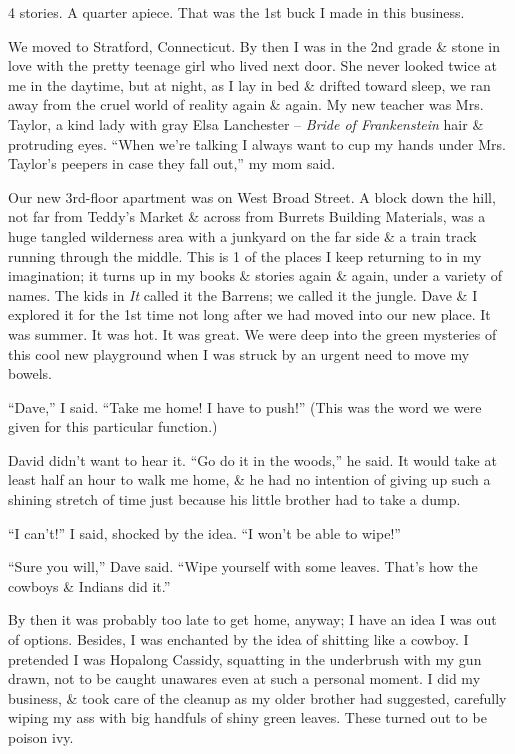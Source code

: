 \documentclass{article}
\numberwithin{equation}{section}
\begin{document}
4 stories. A quarter apiece. That was the 1st buck I made in this business.

 We moved to Stratford, Connecticut. By then I was in the 2nd grade \& stone in love with the pretty teenage girl who lived next door. She never looked twice at me in the daytime, but at night, as I lay in bed \& drifted toward sleep, we ran away from the cruel world of reality again \& again. My new teacher was Mrs. Taylor, a kind lady with gray Elsa Lanchester -- \textit{Bride of Frankenstein} hair \& protruding eyes. ``When we're talking I always want to cup my hands under Mrs. Taylor's peepers in case they fall out,'' my mom said.

Our new 3rd-floor apartment was on West Broad Street. A block down the hill, not far from Teddy's Market \& across from Burrets Building Materials, was a huge tangled wilderness area with a junkyard on the far side \& a train track running through the middle. This is 1 of the places I keep returning to in my imagination; it turns up in my books \& stories again \& again, under a variety of names. The kids in \textit{It} called it the Barrens; we called it the jungle. Dave \& I explored it for the 1st time not long after we had moved into our new place. It was summer. It was hot. It was great. We were deep into the green mysteries of this cool new playground when I was struck by an urgent need to move my bowels.

``Dave,'' I said. ``Take me home! I have to push!'' (This was the word we were given for this particular function.)

David didn't want to hear it. ``Go do it in the woods,'' he said. It would take at least half an hour to walk me home, \& he had no intention of giving up such a shining stretch of time just because his little brother had to take a dump.

``I can't!'' I said, shocked by the idea. ``I won't be able to wipe!''

``Sure you will,'' Dave said. ``Wipe yourself with some leaves. That's how the cowboys \& Indians did it.''

By then it was probably too late to get home, anyway; I have an idea I was out of options. Besides, I was enchanted by the idea of shitting like a cowboy. I pretended I was Hopalong Cassidy, squatting in the underbrush with my gun drawn, not to be caught unawares even at such a personal moment. I did my business, \& took care of the cleanup as my older brother had suggested, carefully wiping my ass with big handfuls of shiny green leaves. These turned out to be poison ivy.
\end{document}
